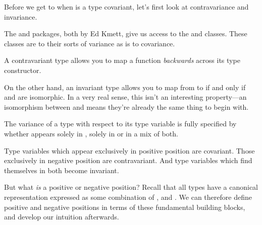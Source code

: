 \documentclass[book.tex]{subfiles}
\begin{document}
Before we get to when is a type covariant, let's first look at
contravariance and invariance.

The \cite{contravariant} and \cite{invariant}
packages, both by Ed Kmett, give us access to the  and
 classes. These classes are to their sorts of variance as
 is to covariance.

A contravariant type allows you to map a function \emph{backwards} across its
type constructor.


On the other hand, an invariant type  allows you to map from  to
 if and only if  and  are isomorphic. In a very real sense,
this isn't an interesting property---an \gls{isomorphism} between  and
 means they're already the same thing to begin with.


The variance of a type  with respect to its type variable  is
fully specified by whether  appears solely in ,
solely in  or in a mix of both.

Type variables which appear exclusively in positive position are covariant.
Those exclusively in negative position are contravariant. And type variables
which find themselves in both become invariant.

But what \emph{is} a positive or negative position? Recall that all types have a
canonical representation expressed as some combination of \ty{(,)},\;
 and \ty{(->)}. We can therefore define positive and negative
positions in terms of these fundamental building blocks, and develop our
intuition afterwards.

\spaceMyBox
\begin{myTable}
\hline
   \\ 
   \\ \hline
   \\ \hline
   \\ \hline
   \\ \hline
\end{myTable}
\spaceMyBox
\end{document}
